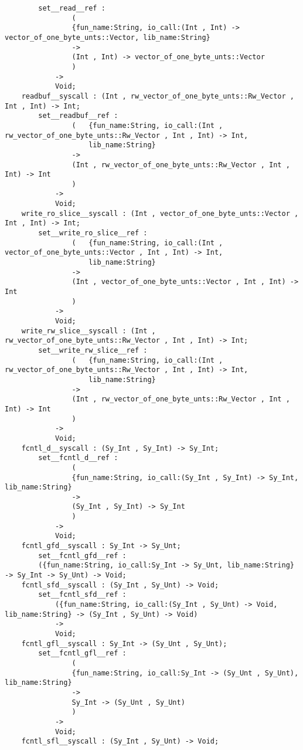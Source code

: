 \begin{verbatim}
        set__read__ref :
                (
                {fun_name:String, io_call:(Int , Int) -> vector_of_one_byte_unts::Vector, lib_name:String}
                ->
                (Int , Int) -> vector_of_one_byte_unts::Vector
                )
            ->
            Void;
    readbuf__syscall : (Int , rw_vector_of_one_byte_unts::Rw_Vector , Int , Int) -> Int;
        set__readbuf__ref :
                (   {fun_name:String, io_call:(Int , rw_vector_of_one_byte_unts::Rw_Vector , Int , Int) -> Int,
                    lib_name:String}
                ->
                (Int , rw_vector_of_one_byte_unts::Rw_Vector , Int , Int) -> Int
                )
            ->
            Void;
    write_ro_slice__syscall : (Int , vector_of_one_byte_unts::Vector , Int , Int) -> Int;
        set__write_ro_slice__ref :
                (   {fun_name:String, io_call:(Int , vector_of_one_byte_unts::Vector , Int , Int) -> Int,
                    lib_name:String}
                ->
                (Int , vector_of_one_byte_unts::Vector , Int , Int) -> Int
                )
            ->
            Void;
    write_rw_slice__syscall : (Int , rw_vector_of_one_byte_unts::Rw_Vector , Int , Int) -> Int;
        set__write_rw_slice__ref :
                (   {fun_name:String, io_call:(Int , rw_vector_of_one_byte_unts::Rw_Vector , Int , Int) -> Int,
                    lib_name:String}
                ->
                (Int , rw_vector_of_one_byte_unts::Rw_Vector , Int , Int) -> Int
                )
            ->
            Void;
    fcntl_d__syscall : (Sy_Int , Sy_Int) -> Sy_Int;
        set__fcntl_d__ref :
                (
                {fun_name:String, io_call:(Sy_Int , Sy_Int) -> Sy_Int, lib_name:String}
                ->
                (Sy_Int , Sy_Int) -> Sy_Int
                )
            ->
            Void;
    fcntl_gfd__syscall : Sy_Int -> Sy_Unt;
        set__fcntl_gfd__ref :
        ({fun_name:String, io_call:Sy_Int -> Sy_Unt, lib_name:String} -> Sy_Int -> Sy_Unt) -> Void;
    fcntl_sfd__syscall : (Sy_Int , Sy_Unt) -> Void;
        set__fcntl_sfd__ref :
            ({fun_name:String, io_call:(Sy_Int , Sy_Unt) -> Void, lib_name:String} -> (Sy_Int , Sy_Unt) -> Void)
            ->
            Void;
    fcntl_gfl__syscall : Sy_Int -> (Sy_Unt , Sy_Unt);
        set__fcntl_gfl__ref :
                (
                {fun_name:String, io_call:Sy_Int -> (Sy_Unt , Sy_Unt), lib_name:String}
                ->
                Sy_Int -> (Sy_Unt , Sy_Unt)
                )
            ->
            Void;
    fcntl_sfl__syscall : (Sy_Int , Sy_Unt) -> Void;

\end{verbatim}
